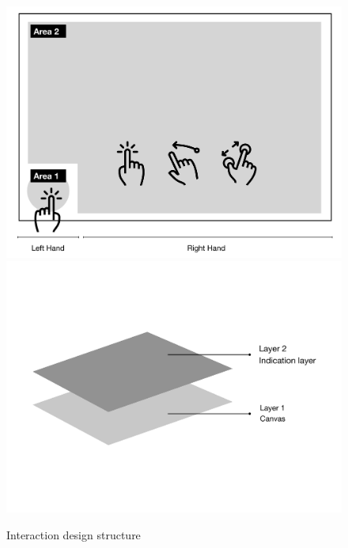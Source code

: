 \documentclass[12pt,twoside]{article}
\begin{document}
\begin{figure}
  \includegraphics[width=\linewidth]{img/design1_structure.pdf}
\endminipage\hfill
{}
  \includegraphics[width=\linewidth]{img/design1_layer.pdf}
\endminipage\hfill
\caption{Interaction design structure}\label{fig:design1_a}
\end{figure}
\end{document}
